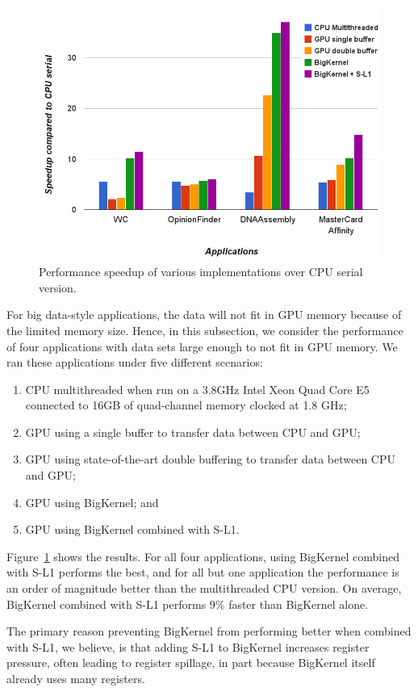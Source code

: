 \begin{figure}[t]
\includegraphics[scale=0.30]{11bigkernelAndSl1.png}
\caption{Performance speedup of various implementations over CPU serial version.}
\label{fig:bigkernelandsl1}
\end{figure}

For big data-style applications, the data will not fit in GPU memory because of the limited memory size. 
Hence, in this subsection, we consider the performance of four applications with data sets large enough to not fit in GPU memory.
We ran these applications under five different scenarios: 
\begin{enumerate}
\item CPU multithreaded when run on a 3.8GHz Intel Xeon Quad Core E5 connected to 16GB of quad-channel memory clocked at 1.8 GHz;
\item GPU using a single buffer to transfer data between CPU and GPU;
\item GPU using state-of-the-art double buffering to transfer data between CPU and GPU;
\item GPU using BigKernel; and
\item GPU using BigKernel combined with S-L1.
\end{enumerate}
Figure~\ref{fig:bigkernelandsl1} shows the results.
For all four applications, using BigKernel combined with S-L1 performs the best,
and for all but one application the performance is an order of magnitude better than the multithreaded CPU version.
On average, BigKernel combined with S-L1 performs 9\% faster than BigKernel alone.

The primary reason preventing BigKernel from performing better when combined with S-L1, we believe, is that adding S-L1 to BigKernel increases register pressure, often leading to register spillage, in part because BigKernel itself already uses many registers.

